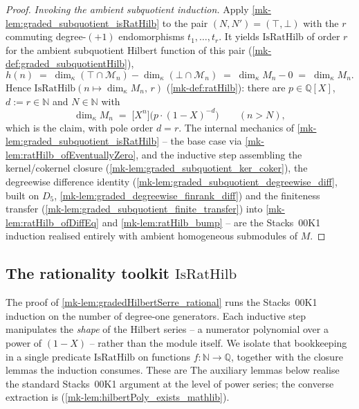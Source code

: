 \begin{proof}
  \emph{Invoking the ambient subquotient induction.} Apply
  \ref{mk-lem:graded_subquotient_isRatHilb} to the pair \((N, N') = (\top, \bot)\)
  with the \(r\) commuting degree-\((+1)\) endomorphisms \(t_1, \dots, t_r\). It
  yields \(\mathrm{IsRatHilb}\) of order \(r\) for the ambient subquotient Hilbert
  function of this pair (\ref{mk-def:graded_subquotientHilb}),
  \[
    h(n) \;=\; \dim_\kappa(\top \cap \mathcal{M}_n) - \dim_\kappa(\bot \cap \mathcal{M}_n)
      \;=\; \dim_\kappa M_n - 0 \;=\; \dim_\kappa M_n .
  \]
  Hence \(\mathrm{IsRatHilb}(n \mapsto \dim_\kappa M_n,\, r)\) (\ref{mk-def:ratHilb}):
  there are \(p \in \mathbb{Q}[X]\), \(d := r \in \mathbb{N}\) and \(N \in \mathbb{N}\)
  with
  \[
    \dim_\kappa M_n \;=\; \bigl[X^n\bigr]\bigl(p \cdot (1 - X)^{-d}\bigr)
    \qquad (n > N),
  \]
  which is the claim, with pole order \(d = r\). The internal mechanics of
  \ref{mk-lem:graded_subquotient_isRatHilb} -- the base case via
  \ref{mk-lem:ratHilb_ofEventuallyZero}, and the inductive step assembling the
  kernel/cokernel closure (\ref{mk-lem:graded_subquotient_ker_coker}), the degreewise
  difference identity (\ref{mk-lem:graded_subquotient_degreewise_diff}, built on
  \(D_5\), \ref{mk-lem:graded_degreewise_finrank_diff}) and the finiteness transfer
  (\ref{mk-lem:graded_subquotient_finite_transfer}) into
  \ref{mk-lem:ratHilb_ofDiffEq} and \ref{mk-lem:ratHilb_bump} -- are the Stacks~00K1
  induction realised entirely with ambient homogeneous submodules of \(M\).
\end{proof}

\subsection{The rationality toolkit \texorpdfstring{\(\mathrm{IsRatHilb}\)}{IsRatHilb}}
\label{mk-subsec:isRatHilb}

The proof of \ref{mk-lem:gradedHilbertSerre_rational} runs the Stacks~00K1 induction
on the number of degree-one generators. Each inductive step manipulates the
\emph{shape} of the Hilbert series -- a numerator polynomial over a power of
\((1-X)\) -- rather than the module itself. We isolate that bookkeeping in a
single predicate \(\mathrm{IsRatHilb}\) on functions \(f : \mathbb{N} \to
\mathbb{Q}\), together with the closure lemmas the induction consumes. These are
  The auxiliary lemmas below realise the standard Stacks~00K1 argument at
  the level of power series; the converse extraction is
  (\ref{mk-lem:hilbertPoly_exists_mathlib}).

